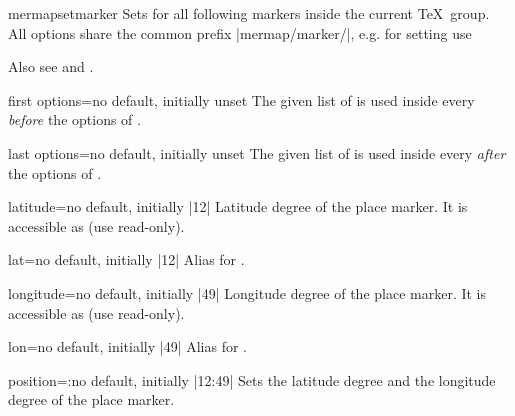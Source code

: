 \begin{docCommand}{mermapsetmarker}{}
  Sets  for all following markers inside the current \TeX\ group.
  All options share the common prefix |mermap/marker/|, e.g. for setting
   use
  \begin{dispListing}
  \end{dispListing}
  Also see  and .
\end{docCommand}

\pagebreak

\begin{docMrcKey}[marker]{first options}{=}{no default, initially unset}
  The given list of  is used inside every 
  \emph{before} the options of .
\end{docMrcKey}

\begin{docMrcKey}[marker]{last options}{=}{no default, initially unset}
  The given list of  is used inside every 
  \emph{after} the options of .
\end{docMrcKey}

\begin{docMrcKey}[marker]{latitude}{=}{no default, initially |12|}
  Latitude degree of the place marker.
  It is accessible as  (use read-only).
\end{docMrcKey}

\begin{docMrcKey}[marker]{lat}{=}{no default, initially |12|}
  Alias for .
\end{docMrcKey}

\begin{docMrcKey}[marker]{longitude}{=}{no default, initially |49|}
  Longitude degree of the place marker.
  It is accessible as  (use read-only).
\end{docMrcKey}

\begin{docMrcKey}[marker]{lon}{=}{no default, initially |49|}
  Alias for .
\end{docMrcKey}

\begin{docMrcKey}[marker]{position}{=:}{no default, initially |12:49|}
  Sets the latitude degree and the longitude degree of the place marker.
\end{docMrcKey}


